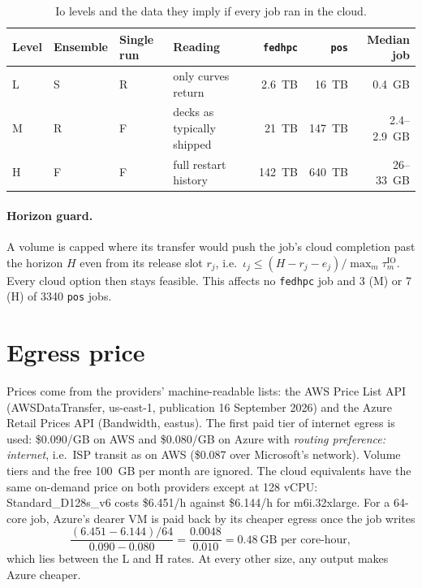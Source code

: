 \documentclass[11pt,a4paper]{article}
\newcommand{\ioVol}{\iota_j}
\newcommand{\tauIO}{\tau^{\mathrm{IO}}}
\newcommand{\code}[1]{\texttt{#1}}
\begin{document}
\begin{table}[ht]
\centering\small
\caption{Io levels and the data they imply if every job ran in the cloud.}\label{tab:levels}
\begin{tabular}{llllrrr}
\toprule
Level & Ensemble & Single run & Reading & \code{fedhpc} & \code{pos} & Median job \\
\midrule
L & S & R & only curves return       & \SI{2.6}{TB} & \SI{16}{TB}  & \SI{0.4}{GB} \\
M & R & F & decks as typically shipped & \SI{21}{TB}  & \SI{147}{TB} & 2.4--\SI{2.9}{GB} \\
H & F & F & full restart history      & \SI{142}{TB} & \SI{640}{TB} & 26--\SI{33}{GB} \\
\bottomrule
\end{tabular}
\end{table}

\paragraph{Horizon guard.} A volume is capped where its transfer would push the
job's cloud completion past the horizon $H$ even from its release slot $r_j$, i.e.\
$\ioVol \le (H - r_j - e_j)/\max_m \tauIO_m$. Every cloud option then stays
feasible. This affects no \code{fedhpc} job and 3 (M) or 7 (H) of \num{3340}
\code{pos} jobs.

\section{Egress price}\label{sec:price}
Prices come from the providers' machine-readable lists: the AWS Price List API
(AWSDataTransfer, us-east-1, publication 16 September 2026) and the Azure Retail
Prices API (Bandwidth, eastus). The first paid tier of internet egress is used:
\$0.090/GB on AWS and \$0.080/GB on Azure with \emph{routing preference: internet},
i.e.\ ISP transit as on AWS (\$0.087 over Microsoft's network). Volume tiers and
the free \SI{100}{GB} per month are ignored. The cloud equivalents have the same
on-demand price on both providers except at 128 vCPU: Standard\_D128s\_v6 costs
\$6.451/h against \$6.144/h for m6i.32xlarge. For a 64-core job, Azure's dearer VM
is paid back by its cheaper egress once the job writes
\begin{equation}
  \frac{(6.451-6.144)/64}{0.090-0.080} = \frac{0.0048}{0.010}
  = 0.48\ \text{GB per core-hour},
\end{equation}
which lies between the L and H rates. At every other size, any output makes Azure
cheaper.
\end{document}
